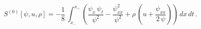 \begin{equation*}
S^{(0)}[\psi,u,\rho] =
-\frac{1}{8}\,\int_{x_-}^{x_+}\left(\frac{\psi_x\,\psi_t}{\psi^2} -
\frac{\psi_{xx}^2}{\psi^2} + \rho\,\left(u +
\frac{\psi_{xx}}{2\,\psi}\right)\right)\,dx\,dt\,.
\end{equation*}

